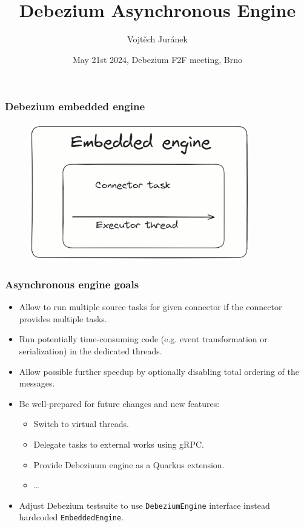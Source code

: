 \documentclass[10pt,utf8]{beamer}
\title{Debezium Asynchronous Engine}
\author{Vojtěch Juránek}
\institute[Red Hat]{Red Hat}
\date{May 21st 2024, Debezium F2F meeting, Brno}
\begin{document}
\begin{frame}
    \titlepage
\end{frame}

\begin{frame}
    \frametitle{Debezium embedded engine}
    \begin{figure}
        \centering
        \includegraphics[height=6cm]{./img/embedded_engine.eps}
    \end{figure}
\end{frame}

\begin{frame}
    \frametitle{Asynchronous engine goals}
    \begin{itemize}
        \item Allow to run multiple source tasks for given connector if the connector provides multiple tasks.
        \item Run potentially time-consuming code (e.g. event transformation or serialization) in the dedicated threads.
        \item Allow possible further speedup by optionally disabling total ordering of the messages.
        \item Be well-prepared for future changes and new features:
        \begin{itemize}
            \item Switch to virtual threads.
            \item Delegate tasks to external works using gRPC.
            \item Provide Debeziuum engine as a Quarkus extension.
            \item \dots
        \end{itemize}
        \item Adjust Debezium testsuite to use \texttt{DebeziumEngine} interface instead hardcoded \texttt{EmbeddedEngine}.
    \end{itemize}
\end{frame}
\end{document}
